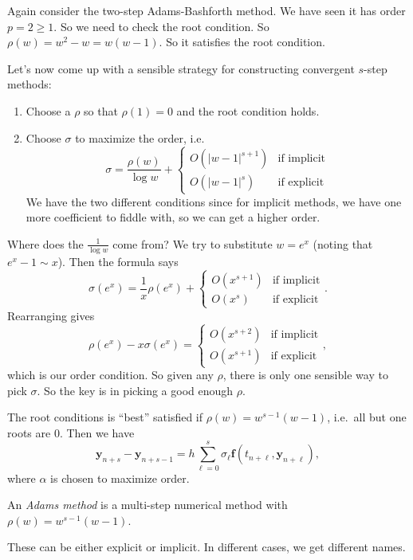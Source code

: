 \documentclass[a4paper]{article}
\begin{document}
\begin{eg}[AB2]
  Again consider the two-step Adams-Bashforth method. We have seen it has order $p = 2 \geq 1$. So we need to check the root condition. So $\rho(w) = w^2 - w = w(w - 1)$. So it satisfies the root condition.
\end{eg}

Let's now come up with a sensible strategy for constructing convergent $s$-step methods:
\begin{enumerate}
  \item Choose a $\rho$ so that $\rho(1) = 0$ and the root condition holds.
  \item Choose $\sigma$ to maximize the order, i.e.
    \[
      \sigma = \frac{\rho(w)}{\log w} +
      \begin{cases}
        O(|w - 1|^{s + 1}) & \text{if implicit}\\
        O(|w - 1|^s) & \text{if explicit}
      \end{cases}
    \]
    We have the two different conditions since for implicit methods, we have one more coefficient to fiddle with, so we can get a higher order.
\end{enumerate}
Where does the $\frac{1}{\log w}$ come from? We try to substitute $w = e^x$ (noting that $e^x - 1\sim x$). Then the formula says
\[
  \sigma(e^x) = \frac{1}{x} \rho(e^x) +
  \begin{cases}
    O(x^{s + 1}) & \text{if implicit}\\
    O(x^s) & \text{if explicit}
  \end{cases}.
\]
Rearranging gives
\[
  \rho(e^x) -x \sigma (e^x) =
  \begin{cases}
    O(x^{s + 2}) & \text{if implicit}\\
    O(x^{s + 1}) & \text{if explicit}
  \end{cases},
\]
which is our order condition. So given any $\rho$, there is only one sensible way to pick $\sigma$. So the key is in picking a good enough $\rho$.

The root conditions is ``best'' satisfied if $\rho(w) = w^{s - 1}(w - 1)$, i.e.\ all but one roots are $0$. Then we have
\[
  \mathbf{y}_{n + s} - \mathbf{y}_{n + s - 1} = h \sum_{\ell = 0}^s \sigma_\ell \mathbf{f}(t_{n + \ell}, \mathbf{y}_{n + \ell}),
\]
where $\alpha$ is chosen to maximize order.

\begin{defi}
  An \emph{Adams method} is a multi-step numerical method with $\rho(w) = w^{s - 1}(w - 1)$.
\end{defi}
These can be either explicit or implicit. In different cases, we get different names.
\end{document}

